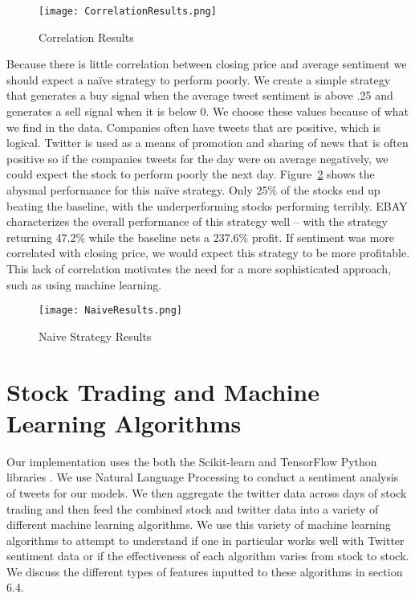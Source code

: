 \documentclass[../thesis.tex]{subfiles}
\begin{document}
\begin{figure}[h]
\centering
\texttt{[image: CorrelationResults.png]}
\caption{Correlation Results \label{overflow}}
\label{Corrfigure}
\end{figure}

Because there is little correlation between closing price and average sentiment we should expect a na\"{i}ve strategy to perform poorly. We create a simple strategy that generates a buy signal when the average tweet sentiment is above .25 and generates a sell signal when it is below 0. We choose these values because of what we find in the data. Companies often have tweets that are positive, which is logical. Twitter is used as a means of promotion and sharing of news that is often positive so if the companies tweets for the day were on average negatively, we could expect the stock to perform poorly the next day. Figure~\ref{Naivefigure} shows the abysmal performance for this na\"{i}ve strategy. Only 25\% of the stocks end up beating the baseline, with the underperforming stocks performing terribly. EBAY characterizes the overall performance of this strategy well -- with the strategy returning 47.2\% while the baseline nets a 237.6\% profit. If sentiment was more correlated with closing price, we would expect this strategy to be more profitable. This lack of correlation motivates the need for a more sophisticated approach, such as using machine learning. 

\begin{figure}[h]
\centering
\texttt{[image: NaiveResults.png]}
\caption{Naive Strategy Results \label{overflow}}
\label{Naivefigure}
\end{figure}


\section{Stock Trading and Machine Learning Algorithms}

Our implementation uses the both the Scikit-learn and TensorFlow Python libraries \cite{PedregosaFABIANPEDREGOSA2011} \cite{Abadi}. We use Natural Language Processing to conduct a sentiment analysis of tweets for our models. We then aggregate the twitter data across days of stock trading and then feed the combined stock and twitter data into a variety of different machine learning algorithms.  We use this variety of machine learning algorithms to attempt to understand if one in particular works well with Twitter sentiment data or if the effectiveness of each algorithm varies from stock to stock. We discuss the different types of features inputted to these algorithms in section 6.4.
\end{document}
